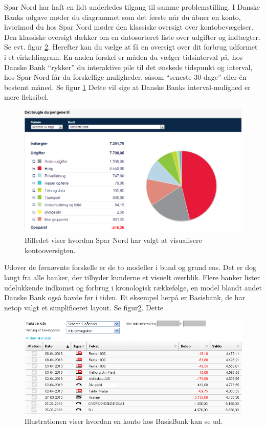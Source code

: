 Spar Nord har haft en lidt anderledes tilgang til samme problemstilling. I Danske Banks udgave møder du diagrammet som det første når du åbner en konto, hvorimod du hos Spar Nord møder den klassiske oversigt over kontobevægelser. Den klassiske oversigt dækker om en datosorteret liste over udgifter og indtægter. Se evt. figur \ref{BasisB}. Herefter kan du vælge at få en oversigt over dit forbrug udformet i et cirkeldiagram. En anden forskel er måden du vælger tidsinterval på, hos Danske Bank “rykker” du interaktive pile til det ønskede tidspunkt og interval, hos Spar Nord får du forskellige muligheder, såsom “seneste 30 dage” eller én bestemt måned. Se figur \ref{SparN} Dette vil sige at Danske Banks interval-mulighed er mere fleksibel.

\begin{figure}[h!]
\centering
\includegraphics[width=1.0\textwidth]{Billeder/SparN.png}
\caption{ Billedet viser hvordan Spar Nord har valgt at visualisere kontooversigten.}
\label{SparN}
\end{figure}

Udover de førnævnte forskelle er de to modeller i bund og grund ens. Det er dog langt fra alle banker, der tilbyder kunderne et visuelt overblik. Flere banker lister udelukkende indkomst og forbrug i kronologisk rækkefølge, en model blandt andet Danske Bank også havde før i tiden. Et eksempel herpå er Basisbank, de har netop valgt et simplificeret layout. Se figur\ref{BasisB}. Dette 

\begin{figure}[h!]
\centering
\includegraphics[width=1.0\textwidth]{Billeder/Basisbank.png}
\caption{ Illustrationen viser hvordan en konto hos BasisBank kan se ud.}
\label{BasisB}
\end{figure}

